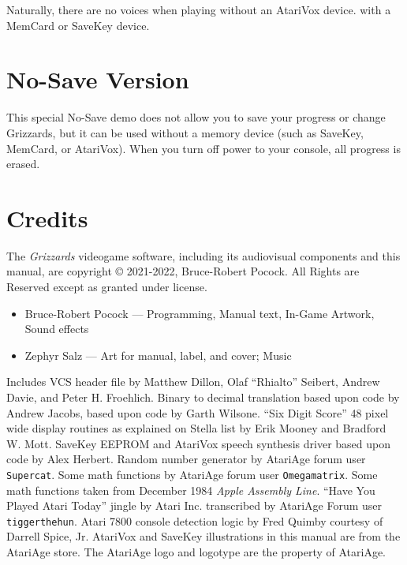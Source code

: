 \documentclass[10pt,twocolumn,openany,article]{memoir}
\begin{document}
\begin{description}
Naturally, there are  no voices when playing  \ifdefined\ATARIAGESAVE without an
AtariVox device. \else with a MemCard or SaveKey device. \fi

\fi

\ifdefined\NOSAVE

\clearpage
\chapter{No-Save Version}

This special  No-Save demo does not  allow you to save  your progress or
change Grizzards,  but it can be  used without a memory  device (such as
SaveKey, MemCard, or AtariVox). When you turn off power to your console,
all progress is erased.

\fi

\fi %

\clearpage
\chapter{Credits}

{\small

  The \textit{Grizzards}  videogame software, including  its audiovisual
  components  and this  manual,  are  copyright \copyright{}  2021-2022,
  Bruce-Robert  Pocock.  All  Rights  are  Reserved  except  as  granted
  under license.

\begin{itemize}
\item Bruce-Robert Pocock --- Programming, Manual text, In-Game Artwork,
  Sound effects
\item Zephyr Salz --- Art for manual, label, and cover; Music
\end{itemize}

\bigskip

Includes VCS  header file by  Matthew Dillon, Olaf  ``Rhialto'' Seibert,
Andrew  Davie, and  Peter H.  Froehlich. Binary  to decimal  translation
based upon  code by  Andrew Jacobs,  based upon  code by  Garth Wilsone.
``Six  Digit Score''  48 pixel  wide  display routines  as explained  on
Stella list  by Erik  Mooney and  Bradford W.  Mott. SaveKey  EEPROM and
AtariVox  speech  synthesis driver  based  upon  code by  Alex  Herbert.
Random  number  generator  by  AtariAge  forum  user  \texttt{Supercat}.
Some  math  functions  by AtariAge  forum  user  \texttt{Omega\-matrix}.
Some  math functions  taken  from December  1984 \textit{Apple  Assembly
  Line}.  ``Have  You   Played  Atari  Today''  jingle   by  Atari  Inc.
transcribed by AtariAge Forum user \texttt{tigger\-the\-hun}. Atari 7800
console detection  logic by Fred  Quimby courtesy of Darrell  Spice, Jr.
AtariVox and SaveKey illustrations in  this manual are from the AtariAge
store.  \ifdefined\DEMO\else  The AtariAge  logo  and  logotype are  the
property of AtariAge. \fi

}
\end{description}
\end{document}

